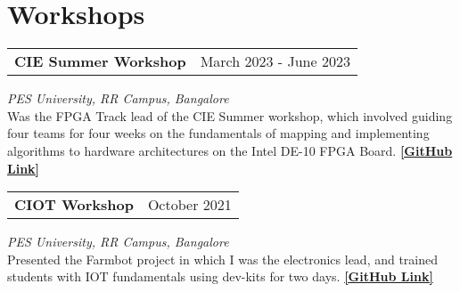 \section{\sc Workshops}

\begin{tabular}{@{}p{4in}p{2in}}
  {\bf{CIE Summer Workshop}}  & March 2023 - June 2023   \\                  
\end{tabular}                                                                                                                                    
\textit{PES University, RR Campus, Bangalore} \\
Was the FPGA Track lead of the CIE Summer workshop, which involved guiding four teams for four weeks on the fundamentals of mapping and implementing algorithms to hardware architectures on the Intel DE-10 FPGA Board. \href{https://github.com/CIE-PESU/DE10_FPGA}{{\bf{[GitHub Link]}}}

\begin{tabular}{@{}p{4in}p{2in}}
  {\bf{CIOT Workshop}}  & October 2021                           
\end{tabular}                 
\textit{PES University, RR Campus, Bangalore} \\
Presented the Farmbot project in which I was the electronics lead, and trained students with IOT fundamentals using dev-kits for two days. \href{https://github.com/govardhnn/farmbot-pesu}{{\bf{[GitHub Link]}}}    
\endinput
